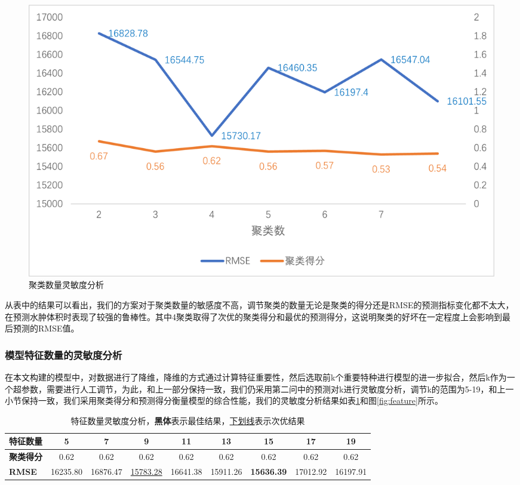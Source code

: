 \documentclass[bwprint]{gmcmthesis}
\begin{document}
\begin{figure}[ht]
    \centering
    \includegraphics[width = 0.8\linewidth]{figures/7.11.png}
    \caption{聚类数量灵敏度分析}
    \label{fig:cluster}
\end{figure}
从表中的结果可以看出，我们的方案对于聚类数量的敏感度不高，调节聚类的数量无论是聚类的得分还是RMSE的预测指标变化都不太大，在预测水肿体积时表现了较强的鲁棒性。其中4聚类取得了次优的聚类得分和最优的预测得分，这说明聚类的好坏在一定程度上会影响到最后预测的RMSE值。

\subsubsection{模型特征数量的灵敏度分析}
在本文构建的模型中，对数据进行了降维，降维的方式通过计算特征重要性，然后选取前k个重要特种进行模型的进一步拟合，然后k作为一个超参数，需要进行人工调节，为此，和上一部分保持一致，我们仍采用第二问中的预测对k进行灵敏度分析，调节k的范围为5-19，和上一小节保持一致，我们采用聚类得分和预测得分衡量模型的综合性能，我们的灵敏度分析结果如表\ref{tab:feature}和图\ref{fig:feature}所示。

\begin{table}[ht]
\centering
\caption{特征数量灵敏度分析，\textbf{黑体}表示最佳结果，\underline{下划线}表示次优结果}
\label{tab:feature}
\fontsize{11}{9}\selectfont
    \renewcommand\tabcolsep{5pt}
    {
\begin{tabular}{lcccccccc}
\toprule[1.2pt]
\textbf{特征数量} & 5             & 7        & 9                 & 11       & 13       & 15       & 17       & 19       \\ \midrule
\textbf{聚类得分} & {0.62} & 0.62     & 0.62              & 0.62     & 0.62     & 0.62     & 0.62     & 0.62     \\
\textbf{RMSE} & 16235.80      & 16876.47 & \underline{15783.28} & 16641.38 & 15911.26 & \textbf{15636.39} & 17012.92 & 16197.91 \\ \bottomrule[1.2pt]
\end{tabular}}
\end{table}
\end{document}
